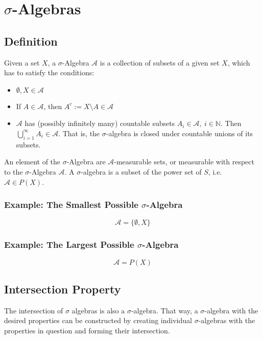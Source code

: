 \section{$\sigma$-Algebras}

\subsection{Definition}
Given a set $X$, a $\sigma$-Algebra $\mathscr{A}$ is a collection of subsets of a given set $X$, which has to satisfy the conditions:


\begin{itemize}
\item $\emptyset, X \in \mathscr{A}$
\item If $A\in\mathscr{A}$, then $A^c := X\setminus A \in \mathscr{A}$
\item $\mathscr{A}$ has (possibly infinitely many) countable subsets $A_i \in \mathscr{A},\ i \in \mathbb{N}$. Then $\bigcup_{i=1}^{\infty}A_i \in \mathscr{A}$. That is, the $\sigma$-algebra is closed under countable unions of its subsets. 
\end{itemize}

An element of the $\sigma$-Algebra are $\mathscr{A}$-measurable sets, or measurable with respect to the $\sigma$-Algebra $\mathscr{A}$. A $\sigma$-algebra is a subset of the power set of $S$, i.e. $\mathscr{A} \in P(X)$.

\subsubsection{Example: The Smallest Possible $\sigma$-Algebra}

\begin{equation}
\mathscr{A} = \{\emptyset, X\}
\end{equation}

\subsubsection{Example: The Largest Possible $\sigma$-Algebra} 

\begin{equation}
\mathscr{A} = P(X)
\end{equation}


\subsection{Intersection Property}
The intersection of $\sigma$ algebras is also a $\sigma$-algebra. That way, a $\sigma$-algebra with the desired properties can be constructed by creating individual $\sigma$-algebras with the properties in question and forming their intersection.

